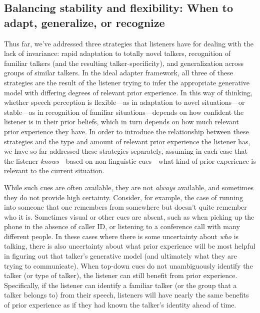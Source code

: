 \label{r1-gen-questions-end}

\subsection{Balancing stability and flexibility: When to adapt, generalize, or recognize}
\label{sec:when-adapt-gener}

Thus far, we've addressed three strategies that listeners have for dealing with the lack of invariance: rapid adaptation to totally novel talkers, recognition of familiar talkers (and the resulting talker-specificity), and generalization across groups of similar talkers.  In the ideal adapter framework, all three of these strategies are the result of the listener trying to infer the appropriate generative model with differing degrees of relevant prior experience.  In this way of thinking, whether speech perception is flexible---as in adaptation to novel situations---or stable---as in recognition of familiar situations---depends on how confident the listener is in their prior beliefs, which in turn depends on how much relevant prior experience they have. 
In order to introduce the relationship between these strategies and the type and amount of relevant prior experience the listener has, we have so far addressed these strategies separately, assuming in each case that the listener \emph{knows}---based on non-linguistic cues---what kind of prior experience is relevant to the current situation.

While such cues are often available, they are not \emph{always} available, and sometimes they do not provide high certainty. Consider, for example, the case of running into someone that one remembers from somewhere but doesn't quite remember who it is. Sometimes visual or other cues are absent, such as when picking up the phone in the absence of caller ID, or listening to a conference call with many different people.  In these cases where there is some uncertainty about \emph{who} is talking, there is also uncertainty about what prior experience will be most helpful in figuring out that talker's generative model (and ultimately what they are trying to communicate).  When top-down cues do not unambiguously identify the talker (or type of talker), the listener can still benefit from prior experience. Specifically, if the listener can identify a familiar talker (or the group that a talker belongs to) from their speech, listeners will have nearly the same benefits of prior experience as if they had known the talker's identity ahead of time.

